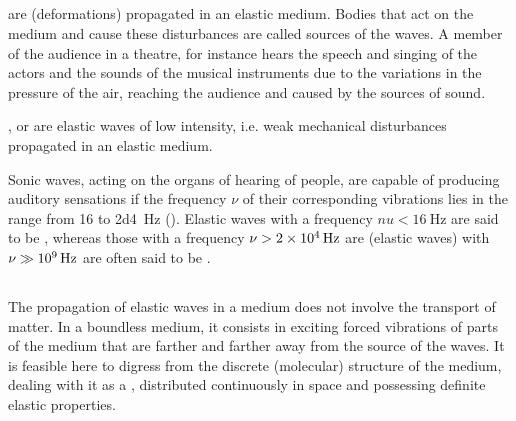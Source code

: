 \subsection{}\label{30.1.3}  are  (deformations) propagated in an elastic medium. Bodies that act on the medium and cause these disturbances are called sources of the waves. A member of
the audience in a theatre, for instance hears the speech and singing of the actors and the sounds of the musical instruments due to the variations in the pressure of the air, reaching the audience and caused by the sources of sound. 

, or  are elastic waves of low intensity, i.e. weak mechanical disturbances propagated in an elastic medium.

Sonic waves, acting on the organs of hearing of people, are capable of producing auditory sensations if the frequency $\nu$ of their
corresponding vibrations lies in the range from 16 to \SI{2d4}{\hertz} (). Elastic waves with a frequency $nu < \SI{16}{\hertz}$ are said to be , whereas those with a frequency $\nu > \SI{2d4}{\hertz}$ are  (elastic waves) with $\nu \gg \SI{d9}{\hertz}$ are often said to be .

\subsection{}\label{30.1.4} The propagation of elastic waves in a
medium does not involve the transport of matter. In a boundless medium, it consists in exciting forced vibrations of parts of the medium that are farther and farther away from the source of the waves. It is feasible here to digress from the discrete (molecular) structure of the medium, dealing with it as a , distributed continuously in space and possessing definite elastic properties. 

